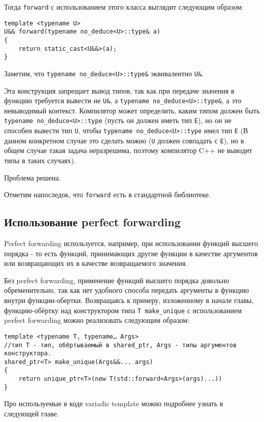 Тогда \texttt{forward} с использованием этого класса выглядит следующим образом:

\begin{verbatim}
template <typename U>
U&& forward(typename no_deduce<U>::type& a)
{
	return static_cast<U&&>(a);
}
\end{verbatim}

Заметим, что \texttt{typename no_deduce<U>::type&} эквивалентно \texttt{U&}.

Эта конструкция запрещает вывод типов, так как при передаче значения в функцию требуется вывести не \texttt{U&}, а \texttt{typename no_deduce<U>::type&}, а это невыводимый контекст. Компилятор может определить, каким типом должен быть \texttt{typename no_deduce<U>::type} (пусть он должен иметь тип \texttt{E}), но он не способен вывести тип \texttt{U}, чтобы \texttt{typename no_deduce<U>::type} имел тип \texttt{E} (В данном конкретном случае это сделать можно (\texttt{U} должен совпадать с \texttt{E}), но в общем случае такая задача неразрешима, поэтому компилятор C++ не выводит типы в таких случаях).

Проблема решена.

Отметим напоследок, что \texttt{forward} есть в стандартной библиотеке.

\subsection{Использование perfect forwarding}

Perfect forwarding используется, например, при использовании функций высшего порядка - то есть функций, принимающих другие функции в качестве аргументов или возвращающих их в качестве возвращаемого значения.

Без perfect forwarding, применение функций высшего порядка довольно обременительно, так как нет удобного способа передать аргументы в функцию внутри функции-обертки.
Возвращаясь к примеру, изложенному в начале главы, функцию-обёртку над конструктором типа \texttt{T make_unique} с использованием perfect forwarding  можно реализовать следующим образом:

\begin{verbatim}
template <typename T, typename… Args>
//тип T - тип, обёртываемый в shared_ptr, Args - типы аргументов конструктора.
shared_ptr<T> make_unique(Args&&... args)
{
	return unique_ptr<T>(new T(std::forward<Args>(args)...))
}
\end{verbatim}

Про используемые в коде variadic template можно подробнее узнать в следующей главе.
